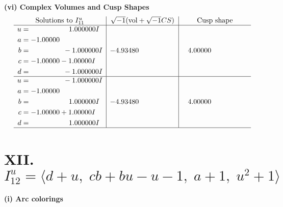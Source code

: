 \documentclass[1p]{elsarticle_modified}
\theoremstyle{definition}
\newcommand{\I}{\sqrt{-1}}
\begin{document}
\newpage\flushleft \textbf{(vi) Complex Volumes and Cusp Shapes}
$$\begin{array}{c|c|c}  
\text{Solutions to }I^u_{11}& \I (\text{vol} + \sqrt{-1}CS) & \text{Cusp shape}\\
 \hline 
\begin{aligned}
u &= \phantom{-0.000000 -}1.000000 I \\
a &= -1.00000\phantom{ +0.000000I} \\
b &= \phantom{-0.000000 } -1.000000 I \\
c &= -1.00000 - 1.00000 I \\
d &= \phantom{-0.000000 } -1.000000 I\end{aligned}
 & -4.93480\phantom{ +0.000000I} & \phantom{-}4.00000\phantom{ +0.000000I} \\ \hline\begin{aligned}
u &= \phantom{-0.000000 } -1.000000 I \\
a &= -1.00000\phantom{ +0.000000I} \\
b &= \phantom{-0.000000 -}1.000000 I \\
c &= -1.00000 + 1.00000 I \\
d &= \phantom{-0.000000 -}1.000000 I\end{aligned}
 & -4.93480\phantom{ +0.000000I} & \phantom{-}4.00000\phantom{ +0.000000I}\\
 \hline 
 \end{array}$$\newpage\newpage\renewcommand{\arraystretch}{1}
\centering \section*{XII. $I^u_{12}= \langle d+u,\;c b+b u- u-1,\;a+1,\;u^2+1 \rangle$}
\flushleft \textbf{(i) Arc colorings}\\
\end{document}
